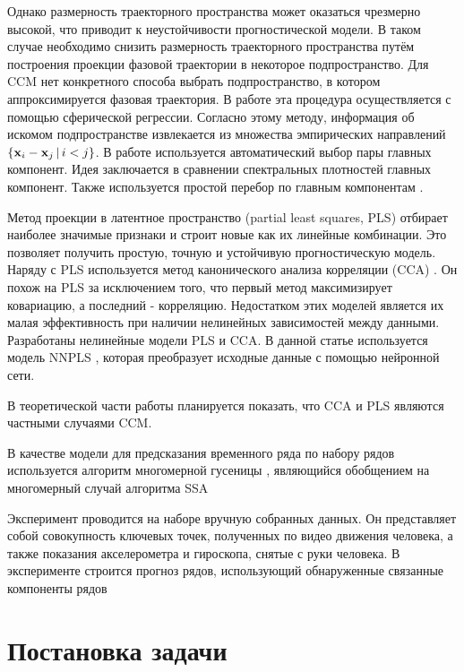 \documentclass[a4paper]{article}
\begin{document}
Однако размерность траекторного пространства может оказаться чрезмерно высокой, что приводит к неустойчивости прогностической модели.
В таком случае необходимо снизить размерность траекторного пространства путём построения проекции фазовой траектории в некоторое подпространство. Для CCM нет конкретного способа выбрать подпространство, в котором аппроксимируется фазовая траектория.
В работе \citep{usmanova2020sphere_regr} эта процедура осуществляется с помощью сферической регрессии. Согласно этому методу, информация об искомом подпространстве извлекается из множества эмпирических направлений $\{ \mathbf{x}_i - \mathbf{x}_j\, | \, i < j \}$.
В работе \citep{alexandrov2005automatic} используется автоматический выбор пары главных компонент. Идея заключается в сравнении спектральных плотностей главных компонент. Также используется простой перебор по главным компонентам \citep{usmanova2019dependencies}.

Метод проекции в латентное пространство (partial least squares, PLS) \citep{rosipal2011nonlinear, rosipal2005overview} отбирает наиболее значимые признаки и строит новые как их линейные комбинации. 
Это позволяет получить простую, точную и устойчивую прогностическую модель.
Наряду с PLS используется метод канонического анализа корреляции (CCA) \citep{hardoon2004canonical}. 
Он похож на PLS за исключением того, что первый метод максимизирует ковариацию, а последний - корреляцию. 
Недостатком этих моделей является их малая эффективность при наличии нелинейных зависимостей между данными.
Разработаны нелинейные модели PLS\citep{qin1992nonlinear, hiden1998non} и CCA\citep{lai2000kernel, andrew2013deep}.
В данной статье используется модель NNPLS \citep{bulut2014new}, которая преобразует исходные данные с помощью нейронной сети. 

В теоретической части работы планируется показать, что CCA и PLS являются частными случаями CCM.

В качестве модели для предсказания временного ряда по набору рядов используется алгоритм многомерной гусеницы \citep{golyandina2005ssa}, являющийся
обобщением на многомерный случай алгоритма SSA

Эксперимент проводится на наборе вручную собранных данных. Он представляет собой совокупность ключевых точек, полученных 
по видео движения человека, а также показания акселерометра и гироскопа, снятые с руки человека. 
В эксперименте строится прогноз рядов, использующий обнаруженные связанные компоненты рядов

\section{Постановка задачи}



\end{document}
